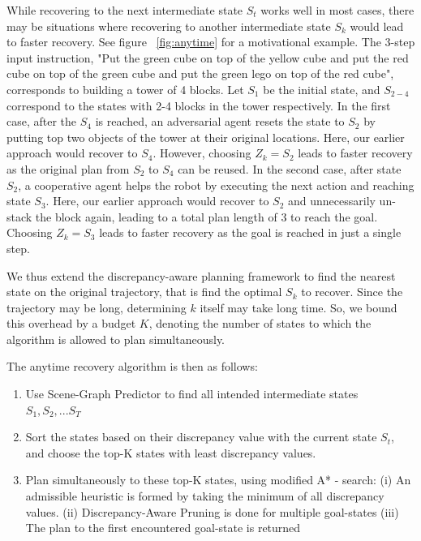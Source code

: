 While recovering to the next intermediate state $S_t$ works well in most cases, there may be situations where recovering to another intermediate state $S_k$ would lead to faster recovery. See figure ~\ref{fig:anytime} for a motivational example. The 3-step input instruction, "Put the green cube on top of the yellow cube and put the red cube on top of the green cube and put the green lego on top of the red cube", corresponds to building a tower of 4 blocks. Let $S_1$ be the initial state, and $S_{2-4}$ correspond to the states with 2-4 blocks in the tower respectively. 
In the first case, after the $S_4$ is reached, an adversarial agent resets the state to $S_2$ by putting top two objects of the tower at their original locations. Here, our earlier approach would recover to $S_4$. However, choosing $Z_k=S_2$ leads to faster recovery as the original plan from $S_2$ to $S_4$ can be reused. 
In the second case, after state $S_2$, a cooperative agent helps the robot by executing the next action and reaching state $S_3$. Here, our earlier approach would recover to $S_2$ and unnecessarily un-stack the block again, leading to a total plan length of 3 to reach the goal. Choosing $Z_k=S_3$ leads to faster recovery as the goal is reached in just a single step.

We thus extend the discrepancy-aware planning framework to find the nearest state on the original trajectory, that is find the optimal $S_k$ to recover.
Since the trajectory may be long, determining $k$ itself may take long time. So, we bound this overhead by a budget $K$, denoting the number of states to which the algorithm is allowed to plan simultaneously.

The anytime recovery algorithm is then as follows:
\begin{enumerate}
    \item Use Scene-Graph Predictor to find all intended intermediate states $S_1, S_2, ... S_T$
    \item Sort the states based on their discrepancy value with the current state $S_t$, and choose the top-K states with least discrepancy values.
    \item Plan simultaneously to these top-K states, using modified A* - search: (i) An admissible heuristic is formed by taking the minimum of all discrepancy values. (ii) Discrepancy-Aware Pruning is done for multiple goal-states (iii) The plan to the first encountered goal-state is returned
\end{enumerate}

